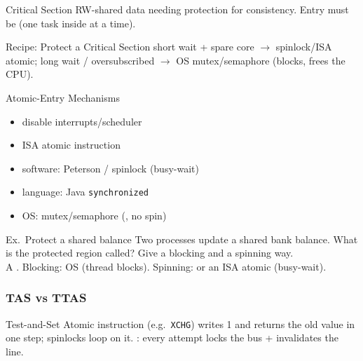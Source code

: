
\begin{definition}{Critical Section}
    RW-shared data needing protection for consistency. Entry must be  (one task inside at a time).
\end{definition}

\begin{KR}{Recipe: Protect a Critical Section}
    short wait + spare core $\to$ spinlock/ISA atomic; long wait / oversubscribed $\to$ OS mutex/semaphore (blocks, frees the CPU).
\end{KR}

\begin{concept}{Atomic-Entry Mechanisms}
    \begin{itemize}
        \item disable interrupts/scheduler
        \item ISA atomic instruction
        \item software: Peterson / spinlock (busy-wait)
        \item language: Java \texttt{synchronized}
        \item OS: mutex/semaphore (, no spin)
    \end{itemize}
\end{concept}

\multend



\begin{example2}{Ex.\ Protect a shared balance}
    Two processes update a shared bank balance. What is the protected region called? Give a blocking and a spinning way.
     \\ 
    A . Blocking: OS  (thread blocks). Spinning:  or an ISA atomic (busy-wait).
\end{example2}

\subsubsection{TAS vs TTAS}

\begin{definition}{Test-and-Set}
    Atomic instruction (e.g.\ \texttt{XCHG}) writes 1 and returns the old value in one step; spinlocks loop on it. : every attempt locks the bus + invalidates the line.
\end{definition}

